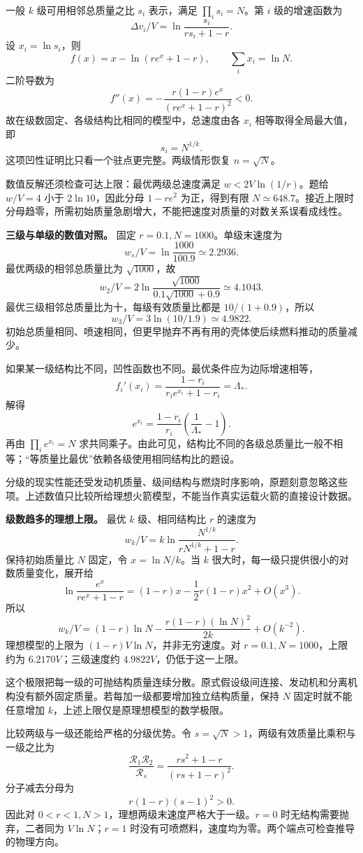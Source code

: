 \documentclass[12pt,a4paper,UTF8]{ctexart}
\begin{document}
一般 \(k\) 级可用相邻总质量之比 \(s_i\) 表示，满足 \(\prod_i s_i=N\)。第
\(i\) 级的增速函数为 \[
\Delta v_i/V=\ln\frac{s_i}{rs_i+1-r}.
\] 设 \(x_i=\ln s_i\)，则 \[
f(x)=x-\ln(re^x+1-r),\qquad \sum_i x_i=\ln N.
\] 二阶导数为 \[
f''(x)=-\frac{r(1-r)e^x}{(re^x+1-r)^2}<0.
\] 故在级数固定、各级结构比相同的模型中，总速度由各 \(x_i\)
相等取得全局最大值，即 \[
s_i=N^{1/k}.
\] 这项凹性证明比只看一个驻点更完整。两级情形恢复 \(n=\sqrt N\)。

数值反解还须检查可达上限：最优两级总速度满足 \(w<2V\ln(1/r)\)。题给
\(w/V=4\) 小于 \(2\ln10\)，因此分母 \(1-re^2\) 为正，得到有限
\(N\simeq648.7\)。接近上限时分母趋零，所需初始质量急剧增大，不能把速度对质量的对数关系误看成线性。

\textbf{三级与单级的数值对照。} 固定 \(r=0.1,N=1000\)。单级末速度为 \[
w_s/V=\ln\frac{1000}{100.9}\simeq2.2936.
\] 最优两级的相邻总质量比为 \(\sqrt{1000}\)，故 \[
w_2/V=2\ln\frac{\sqrt{1000}}{0.1\sqrt{1000}+0.9}\simeq4.1043.
\] 最优三级相邻总质量比为十，每级有效质量比都是 \(10/(1+0.9)\)，所以 \[
w_3/V=3\ln(10/1.9)\simeq4.9822.
\]
初始总质量相同、喷速相同，但更早抛弃不再有用的壳体使后续燃料推动的质量减少。

如果某一级结构比不同，凹性函数也不同。最优条件应为边际增速相等， \[
f_i'(x_i)=\frac{1-r_i}{r_ie^{x_i}+1-r_i}=\Lambda_*.
\] 解得 \[
e^{x_i}=\frac{1-r_i}{r_i}\left(\frac1{\Lambda_*}-1\right).
\] 再由 \(\prod_i e^{x_i}=N\)
求共同乘子。由此可见，结构比不同的各级总质量比一般不相等；``等质量比最优''依赖各级使用相同结构比的题设。

分级的现实性能还受发动机质量、级间结构与燃烧时序影响，原题刻意忽略这些项。上述数值只比较所给理想火箭模型，不能当作真实运载火箭的直接设计数据。

\textbf{级数趋多的理想上限。} 最优 \(k\) 级、相同结构比 \(r\) 的速度为
\[
w_k/V=k\ln\frac{N^{1/k}}{rN^{1/k}+1-r}.
\] 保持初始质量比 \(N\) 固定，令 \(x=\ln N/k\)。当 \(k\)
很大时，每一级只提供很小的对数质量变化，展开给 \[
\ln\frac{e^x}{re^x+1-r}
=(1-r)x-\frac12r(1-r)x^2+O(x^3).
\] 所以 \[
w_k/V=(1-r)\ln N-
\frac{r(1-r)(\ln N)^2}{2k}+O(k^{-2}).
\] 理想模型的上限为 \((1-r)V\ln N\)，并非无穷速度。对
\(r=0.1,N=1000\)，上限约为 \(6.2170V\)；三级速度约
\(4.9822V\)，仍低于这一上限。

这个极限把每一级的可抛结构质量连续分散。原式假设级间连接、发动机和分离机构没有额外固定质量。若每加一级都要增加独立结构质量，保持
\(N\) 固定时就不能任意增加 \(k\)，上述上限仅是原理想模型的数学极限。

比较两级与一级还能给严格的分级优势。令
\(s=\sqrt N>1\)，两级有效质量比乘积与一级之比为 \[
\frac{\mathcal R_1\mathcal R_2}{\mathcal R_s}
=\frac{rs^2+1-r}{(rs+1-r)^2}.
\] 分子减去分母为 \[
r(1-r)(s-1)^2>0.
\] 因此对 \(0<r<1,N>1\)，理想两级末速度严格大于一级。\(r=0\)
时无结构需要抛弃，二者同为 \(V\ln N\)；\(r=1\)
时没有可喷燃料，速度均为零。两个端点可检查推导的物理方向。
\end{document}
